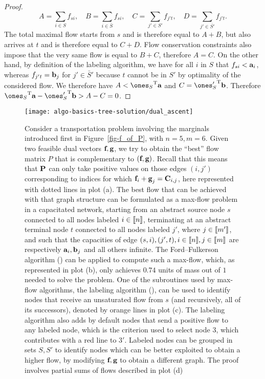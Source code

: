 \begin{proof}
$$A = \sum_{i\in S} f_{si}, \quad B = \sum_{i\in \bar{S}} f_{si}, \quad C = \sum_{j'\in S'} f_{j't}, \quad D = \sum_{j'\in \bar{S'}} f_{j't}.$$
The total maximal flow starts from $s$ and is therefore equal to $A+B$, but also arrives at $t$ and is therefore equal to $C+D$. Flow conservation constraints also impose that the very same flow is equal to $B+C$, therefore $A=C$. On the other hand, by definition of the labeling algorithm, we have for all $i$ in $S$ that $f_{si}<\a_i$, whereas $f_{j't}=\b_j$ for $j'\in \bar{S}'$ because $t$ cannot be in $S'$ by optimality of the considered flow. We therefore have $A<\transp{\ones_S}\a$ and $C=\transp{\ones_S'}\b$. Therefore $\transp{\ones_S}\a-\transp{\ones_S'}\b>A-C=0$.
\end{proof}

\begin{figure}[h!]
\centering
\texttt{[image: algo-basics-tree-solution/dual\_ascent]}
\caption{\label{fig-dualascent}
Consider a transportation problem involving the marginals introduced first in Figure~\ref{fig-f_of_P}, with $n=5, m=6$. Given two feasible dual vectors $\fD,\gD$, we try to obtain the ``best'' flow matrix $P$ that is complementary to $(\fD,\gD)$. Recall that this means that $\P$ can only take positive values on those edges $(i,j')$ corresponding to indices for which $\fD_i+\gD_j=\C_{i,j}$, here represented with dotted lines in plot (a). The best flow that can be achieved with that graph structure can be formulated as a max-flow problem in a capacitated network, starting from an abstract source node $s$ connected to all nodes labeled $i\in\range{n}$, terminating at an abstract terminal node $t$ connected to all nodes labeled $j'$, where $j\in\range{m'}$, and such that the capacities of edge $(s,i),(j',t), i\in \range{n},j\in\range{m}$ are respectively $\a_i,\b_j$ and all others infinite. The Ford--Fulkerson algorithm (\cite[p. 305]{bertsimas1997introduction}) can be applied to compute such a max-flow, which, as represented in plot (b), only achieves $0.74$ units of mass out of $1$ needed to solve the problem. One of the subroutines used by max-flow algorithms, the labeling algorithm (\cite[p. 308]{bertsimas1997introduction}), can be used to identify nodes that receive an unsaturated flow from $s$ (and recursively, all of its successors), denoted by orange lines in plot (c). The labeling algorithm also adds by default nodes that send a positive flow to any labeled node, which is the criterion used to select node $3$, which contributes with a red line to $3'$. Labeled nodes can be grouped in sets $S,S'$ to identify nodes which can be better exploited to obtain a higher flow, by modifying $\fD,\gD$ to obtain a different graph. The proof involves partial sums of flows described in plot (d)}
\end{figure}

